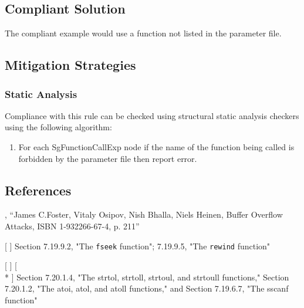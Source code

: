 \subsection{Compliant Solution}
The compliant example would use a function not listed in the parameter file.

\subsection{Mitigation Strategies}
\subsubsection{Static Analysis} 

Compliance with this rule can be checked using structural static analysis checkers using the following algorithm:

\begin{enumerate}
\item For each SgFunctionCallExp node if the name of the function being called is forbidden by the parameter file then report error. 
\end{enumerate}

\subsection{References}

 , ``James C.Foster, Vitaly Osipov, Nish Bhalla, Niels Heinen, Buffer Overflow Attacks, ISBN 1-932266-67-4, p. 211''



[  ] Section 7.19.9.2, "The {\tt fseek} function"; 7.19.9.5, "The {\tt rewind} function"

[  ] [ \\*
    ] Section 7.20.1.4, "The strtol, strtoll, strtoul, and strtoull functions," Section 7.20.1.2, "The atoi, atol, and atoll functions," and Section 7.19.6.7, "The sscanf function"

